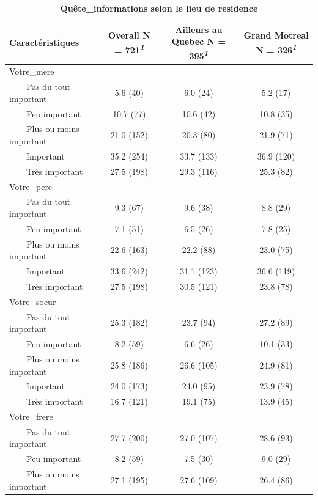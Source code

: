 \documentclass[
]{article}
\begin{document}
\newpage
\begin{table}[!t]
\caption{\label{tab:unnamed-chunk-16}\textbf{Quête\_informations selon le lieu de residence}} 
\fontsize{12.0pt}{14.4pt}\selectfont
\begin{tabular*}{\linewidth}{@{\extracolsep{\fill}}lccc}
\toprule
\textbf{Caractéristiques} & \textbf{Overall}  N = 721\textsuperscript{\textit{1}} & \textbf{Ailleurs au Quebec}  N = 395\textsuperscript{\textit{1}} & \textbf{Grand Motreal}  N = 326\textsuperscript{\textit{1}} \\ 
\midrule\addlinespace[2.5pt]
Votre\_mere &  &  &  \\ 
    Pas du tout important & 5.6 (40) & 6.0 (24) & 5.2 (17) \\ 
    Peu important & 10.7 (77) & 10.6 (42) & 10.8 (35) \\ 
    Plus ou moins important & 21.0 (152) & 20.3 (80) & 21.9 (71) \\ 
    Important & 35.2 (254) & 33.7 (133) & 36.9 (120) \\ 
    Très important & 27.5 (198) & 29.3 (116) & 25.3 (82) \\ 
Votre\_pere &  &  &  \\ 
    Pas du tout important & 9.3 (67) & 9.6 (38) & 8.8 (29) \\ 
    Peu important & 7.1 (51) & 6.5 (26) & 7.8 (25) \\ 
    Plus ou moins important & 22.6 (163) & 22.2 (88) & 23.0 (75) \\ 
    Important & 33.6 (242) & 31.1 (123) & 36.6 (119) \\ 
    Très important & 27.5 (198) & 30.5 (121) & 23.8 (78) \\ 
Votre\_soeur &  &  &  \\ 
    Pas du tout important & 25.3 (182) & 23.7 (94) & 27.2 (89) \\ 
    Peu important & 8.2 (59) & 6.6 (26) & 10.1 (33) \\ 
    Plus ou moins important & 25.8 (186) & 26.6 (105) & 24.9 (81) \\ 
    Important & 24.0 (173) & 24.0 (95) & 23.9 (78) \\ 
    Très important & 16.7 (121) & 19.1 (75) & 13.9 (45) \\ 
Votre\_frere &  &  &  \\ 
    Pas du tout important & 27.7 (200) & 27.0 (107) & 28.6 (93) \\ 
    Peu important & 8.2 (59) & 7.5 (30) & 9.0 (29) \\ 
    Plus ou moins important & 27.1 (195) & 27.6 (109) & 26.4 (86) \\ 

\end{tabular*}
\end{table}
\end{document}
